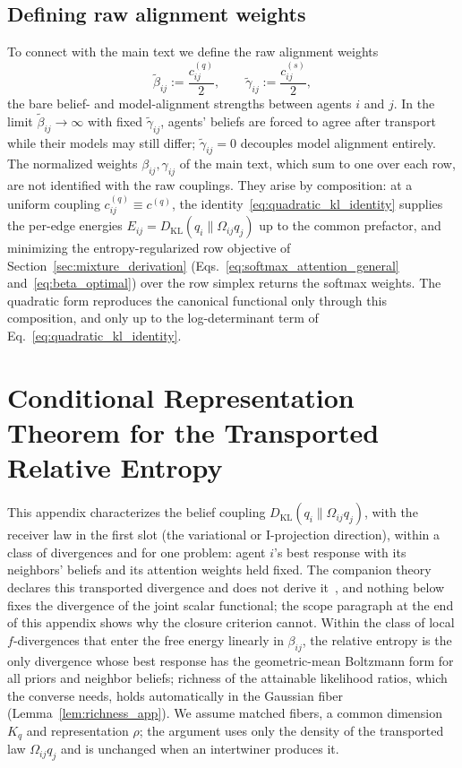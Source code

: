 \documentclass[11pt]{article}
\begin{document}
\subsection{Defining raw alignment weights}
\label{sec:raw_alignment_weights}
To connect with the main text we define the raw alignment weights
\begin{equation}
\tilde\beta_{ij}:=\frac{c^{(q)}_{ij}}{2},
\qquad
\tilde\gamma_{ij}:=\frac{c^{(s)}_{ij}}{2},
\end{equation}
the bare belief- and model-alignment strengths between agents $i$ and $j$. In the limit $\tilde\beta_{ij} \to \infty$ with fixed $\tilde\gamma_{ij}$, agents' beliefs are forced to agree after transport while their models may still differ; $\tilde\gamma_{ij} = 0$ decouples model alignment entirely. The normalized weights $\beta_{ij}, \gamma_{ij}$ of the main text, which sum to one over each row, are not identified with the raw couplings. They arise by composition: at a uniform coupling $c^{(q)}_{ij} \equiv c^{(q)}$, the identity~\eqref{eq:quadratic_kl_identity} supplies the per-edge energies $E_{ij} = D_{\mathrm{KL}}(q_i \| \Omega_{ij}q_j)$ up to the common prefactor, and minimizing the entropy-regularized row objective of Section~\ref{sec:mixture_derivation} (Eqs.~\eqref{eq:softmax_attention_general} and~\eqref{eq:beta_optimal}) over the row simplex returns the softmax weights. The quadratic form reproduces the canonical functional only through this composition, and only up to the log-determinant term of Eq.~\eqref{eq:quadratic_kl_identity}.

\section{Conditional Representation Theorem for the Transported Relative Entropy}
\label{app:conditional_representation}

This appendix characterizes the belief coupling $D_{\mathrm{KL}}(q_i\|\Omega_{ij}q_j)$, with the receiver law in the first slot (the variational or I-projection direction), within a class of divergences and for one problem: agent $i$'s best response with its neighbors' beliefs and its attention weights held fixed. The companion theory declares this transported divergence and does not derive it~\cite[Chs.~6 and~12]{DennisGaugeVFE2026}, and nothing below fixes the divergence of the joint scalar functional; the scope paragraph at the end of this appendix shows why the closure criterion cannot. Within the class of local $f$-divergences that enter the free energy linearly in $\beta_{ij}$, the relative entropy is the only divergence whose best response has the geometric-mean Boltzmann form for all priors and neighbor beliefs; richness of the attainable likelihood ratios, which the converse needs, holds automatically in the Gaussian fiber (Lemma~\ref{lem:richness_app}). We assume matched fibers, a common dimension $K_q$ and representation $\rho$; the argument uses only the density of the transported law $\Omega_{ij}q_j$ and is unchanged when an intertwiner produces it.
\end{document}
